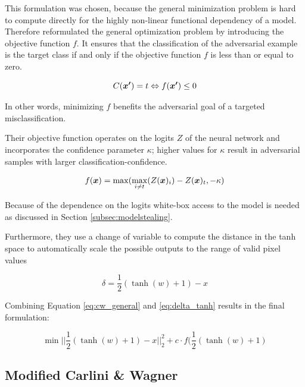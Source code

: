 This formulation was chosen, because the general minimization problem is hard to compute directly for the highly non-linear functional dependency of a model. Therefore \citeauthor{carlini2017towards} reformulated the general optimization problem by introducing the objective function $f$.
It ensures that the classification of the adversarial example is the target class if and only if the objective function $f$ is less than or equal to zero.

\begin{equation*}
C(\myvec{x'}) = t \Leftrightarrow f(\myvec{x'}) \leq 0
\vspace{1ex}
\end{equation*}

In other words, minimizing $f$ benefits the adversarial goal of a targeted misclassification.

Their objective function operates on the logits $Z$ of the neural network and incorporates the confidence parameter $\kappa$; higher values for $\kappa$ result in adversarial samples with larger classification-confidence.

\begin{equation*}
f(\boldsymbol{x}) = \max(\underset{i\neq t}{\max}(Z(\boldsymbol{x})_i) - Z(\boldsymbol{x})_t, -\kappa)
\end{equation*}

Because of the dependence on the logits white-box access to the model is needed as discussed in Section \ref{subsec:modelstealing}.

Furthermore, they use a change of variable to compute the distance in the tanh space to automatically scale the possible outputs to the range of valid pixel values

\begin{equation}\label{eq:delta_tanh}
\delta = \frac{1}{2}(\tanh(w)+1) - x
\end{equation}

Combining Equation \ref{eq:cw_general} and \ref{eq:delta_tanh} results in the final formulation:

\begin{equation}\label{eq:cwl2_min_final}
\min ||\frac{1}{2}(\tanh(w)+1)-x||^2_2 + c \cdot f(\frac{1}{2}(\tanh(w)+1)
\end{equation}

\subsection{Modified Carlini \& Wagner}\label{subsec:cwl2_mod}

